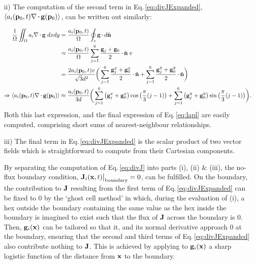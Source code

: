 \documentclass[9pt,lineno]{elife}
\begin{document}
ii) The computation of the second term in Eq.\,\ref{eq:divJExpanded},
$\langle a_i(\mb{p}_0,t)\nabla\vcdot\mb{g}(\mb{p}_0)\rangle$, can be written out similarly:

\begin{equation} \label{eq:divg}
\begin{split}
%
\frac{1}{\Omega} \iint_\Omega a_i\nabla\vcdot\mb{g}\;dxdy & = \frac{a_i(\mb{p}_0,t)}{\Omega}  \oint_c \mb{g}\vcdot d\hat{\mathbf{n}} \\
%
& \approx \frac{a_i(\mb{p}_0,t)}{\Omega} \sum_{j=1}^{6} \frac{\mb{g}_j + \mb{g}_0}{2}\vcdot \hat{\mb{n}}\;v \\
%
& = \frac{2 a_i(\mb{p}_0,t)v}{\sqrt{3}d^2} \bigg( \sum_{j=1}^{6} \frac{\mb{g}_j^x + \mb{g}_0^x}{2} \vcdot  \hat{\mb{n}} + \sum_{j=1}^{6} \frac{\mb{g}_j^y + \mb{g}_0^y}{2} \vcdot  \hat{\mb{n}} \bigg) \\
%
%
\Rightarrow \langle a_i(\mb{p}_0,t)\nabla\vcdot\mb{g}(\mb{p}_0)\rangle & \approx \frac{a_i(\mb{p}_0,t)}{3d} \bigg( \sum_{j=1}^{6} \big(\mb{g}_j^x + \mb{g}_0^x\big) \cos \big(\frac{\pi}{3}(j-1)\big) + \sum_{j=1}^{6} \big({\mb{g}_j^y + \mb{g}_0^y}\big) \sin \big(\frac{\pi}{3}(j-1)\big) \bigg). \\
%
\end{split}
\end{equation}
%
Both this last expression, and the final expression of Eq.\,\ref{eq:lapl} are
easily computed, comprising short sums of nearest-neighbour relationships.

iii) The final term in Eq.\,\ref{eq:divJExpanded} is the scalar product of two
vector fields which is straightforward to compute from their Cartesian
components.

By separating the computation of Eq.\,\ref{eq:divJ} into parts (i), (ii) \&
(iii), the no-flux boundary condition,
$\mathbf{J}_i(\mathbf{x},t)\big\rvert_{\mathrm{boundary}} = 0$, can be fulfilled. On
the boundary, the contribution to $\mathbf{J}$ resulting from the first term of
Eq.\,\ref{eq:divJExpanded} can be fixed to 0 by the `ghost cell method' in
which, during the evaluation of (i), a hex outside the boundary containing the
same value as the hex inside the boundary is imagined to exist such that the
flux of $\mathbf{J}$ across the boundary is 0. Then, $\mathbf{g}_i(\mathbf{x})$ can be
tailored so that it, and its normal derivative approach 0 at the boundary,
ensuring that the second and third terms of Eq.\,\ref{eq:divJExpanded} also
contribute nothing to $\mathbf{J}$. This is achieved by applying to
$\mathbf{g}_i(\mathbf{x})$ a sharp logistic function of the distance from $\mathbf{x}$ to
the boundary.
\end{document}
